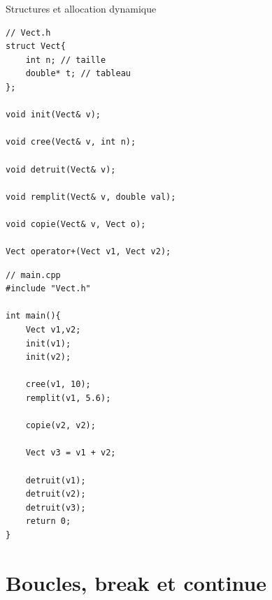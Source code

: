 \begin{frame}[fragile=singleslide]{Structures et allocation dynamique}
    \begin{minipage}{0.48\linewidth}
    \vspace{-3em}
        \begin{verbatim}
// Vect.h
struct Vect{
    int n; // taille
    double* t; // tableau
};

void init(Vect& v);

void cree(Vect& v, int n);

void detruit(Vect& v);

void remplit(Vect& v, double val);

void copie(Vect& v, Vect o);

Vect operator+(Vect v1, Vect v2);
        \end{verbatim}
    \end{minipage}
    \begin{minipage}{0.48\linewidth}
        \begin{verbatim}
// main.cpp
#include "Vect.h"

int main(){
    Vect v1,v2;
    init(v1);
    init(v2);

    cree(v1, 10);
    remplit(v1, 5.6);

    copie(v2, v2);

    Vect v3 = v1 + v2;

    detruit(v1);
    detruit(v2);
    detruit(v3);
    return 0;
}
        \end{verbatim}
    \end{minipage}
\end{frame}

\section{Boucles, break et continue}

